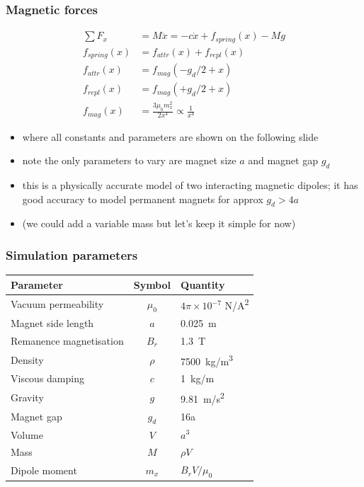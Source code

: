 \documentclass[9pt]{beamer-control}
\begin{document}
\begin{frame}
  \frametitle{Magnetic forces}

  \begin{align}
    \sum F_x &= M\ddot x = - c\dot x + f_{spring}(x) - Mg\\
    f_{spring}(x)  &= f_{attr}(x) + f_{repl}(x) \\
    f_{attr}(x) &= f_{mag}(-g_d/2+x) \\
    f_{repl}(x) &= f_{mag}(+g_d/2+x) \\
    f_{mag}(x)  &= \frac{3 \mu_0 m_x^2}{2 x^4} \propto \frac{1}{x^4}
  \end{align}
  \begin{itemize}
    \item where all constants and parameters are shown on the following slide
    \item note the only parameters to vary are magnet size $a$ and magnet gap $g_d$
    \item this is a physically accurate model of two interacting magnetic dipoles; it has good accuracy to model permanent magnets for approx $g_d>4a$
    \item (we could add a variable mass but let's keep it simple for now)
  \end{itemize}

\end{frame}

\begin{frame}
  \frametitle{Simulation parameters}

  \begin{tabular}{lcl}
    \toprule
    Parameter & Symbol & Quantity \\
    \midrule
    Vacuum permeability & $\mu_0$ & $4\pi\times10^{-7}$ \si{N/A^2} \\
    Magnet side length & $a$ & \qty{0.025}{m} \\
    Remanence magnetisation & $B_r$ & \qty{1.3}{T} \\
    Density & $\rho$ & \qty{7500}{kg/m^3} \\
    Viscous damping & $c$ & \qty{1}{kg/m} \\
    Gravity & $g$ & \qty{9.81}{m/s^2} \\
    \midrule
    Magnet gap & $g_d$ & 16a \\
    \midrule
    Volume & $V$ & $a^3$ \\
    Mass & $M$ & $\rho V$ \\
    Dipole moment & $m_x$ & $B_r V/\mu_0$\\
    \bottomrule
  \end{tabular}

\end{frame}
\end{document}
